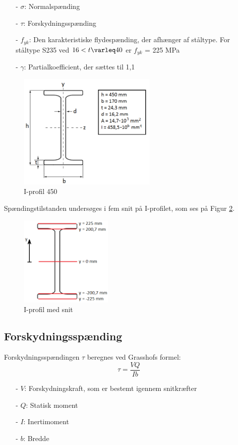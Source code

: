 \begin{itemize}
	\item[-] $\sigma$: Normalspænding 
	\item[-] $\tau$: Forskydningsspænding
	\item[-] $f_{yk}$: Den karakteristiske flydespænding, der afhænger af ståltype. For ståltype S235 ved $16 < t \varleq 40$ er $f_{yk}$ = 225 MPa \citep[ s. 213]{stabi}
	\item[-] $\gamma$: Partialkoefficient, der sættes til 1,1 \citep[ s. 212]{stabi}
\end{itemize}

\begin{figure}[H]
	\centering
	\includegraphics[width=0.6\textwidth]{billeder/iprofil.png}
	\caption{I-profil 450}
	\label{fig:iprofil}
\end{figure}

Spændingstilstanden undersøges i fem snit på I-profilet, som ses på Figur \ref{fig:iprofilsnit}.

\begin{figure}[H]
	\centering
	\includegraphics[width=0.4\textwidth]{billeder/iprofilsnit.png}
	\caption{I-profil med snit}
	\label{fig:iprofilsnit}
\end{figure}

\subsection{Forskydningsspænding}
Forskydningsspændingen $\tau$ beregnes ved Grasshofs formel:
\begin{equation}
\tau = \frac{VQ}{Ib}
\end{equation}
\begin{itemize}
	\item[-] $V$: Forskydningskraft, som er bestemt igennem snitkræfter
	\item[-] $Q$: Statisk moment
	\item[-] $I$: Inertimoment
	\item[-] $b$: Bredde
\end{itemize}

